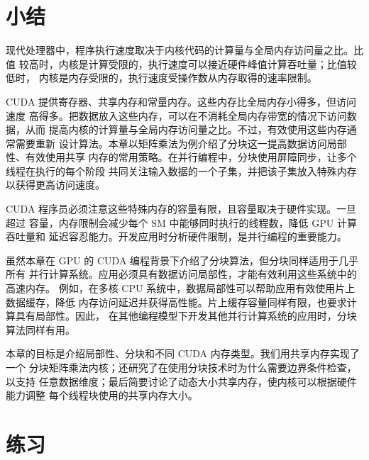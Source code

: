 \section{小结}
\label{sec:chapter-5-summary}

现代处理器中，程序执行速度取决于内核代码的计算量与全局内存访问量之比。比值
较高时，内核是计算受限的，执行速度可以接近硬件峰值计算吞吐量；比值较低时，
内核是内存受限的，执行速度受操作数从内存取得的速率限制。

CUDA 提供寄存器、共享内存和常量内存。这些内存比全局内存小得多，但访问速度
高得多。把数据放入这些内存，可以在不消耗全局内存带宽的情况下访问数据，从而
提高内核的计算量与全局内存访问量之比。不过，有效使用这些内存通常需要重新
设计算法。本章以矩阵乘法为例介绍了分块这一提高数据访问局部性、有效使用共享
内存的常用策略。在并行编程中，分块使用屏障同步，让多个线程在执行的每个阶段
共同关注输入数据的一个子集，并把该子集放入特殊内存以获得更高访问速度。

CUDA 程序员必须注意这些特殊内存的容量有限，且容量取决于硬件实现。一旦超过
容量，内存限制会减少每个 SM 中能够同时执行的线程数，降低 GPU 计算吞吐量和
延迟容忍能力。开发应用时分析硬件限制，是并行编程的重要能力。

虽然本章在 GPU 的 CUDA 编程背景下介绍了分块算法，但分块同样适用于几乎所有
并行计算系统。应用必须具有数据访问局部性，才能有效利用这些系统中的高速内存。
例如，在多核 CPU 系统中，数据局部性可以帮助应用有效使用片上数据缓存，降低
内存访问延迟并获得高性能。片上缓存容量同样有限，也要求计算具有局部性。因此，
在其他编程模型下开发其他并行计算系统的应用时，分块算法同样有用。

本章的目标是介绍局部性、分块和不同 CUDA 内存类型。我们用共享内存实现了一个
分块矩阵乘法内核；还研究了在使用分块技术时为什么需要边界条件检查，以支持
任意数据维度；最后简要讨论了动态大小共享内存，使内核可以根据硬件能力调整
每个线程块使用的共享内存大小。

\section*{练习}

